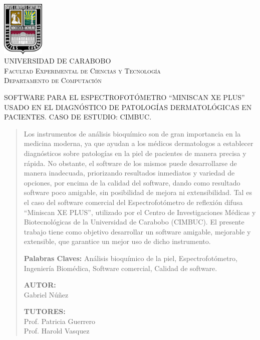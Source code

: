 \documentclass[12pt, a4paper]{article}
\begin{document}
\begin{center}

\includegraphics[width=0.15\textwidth]{./img/logo-uc.png}~\\[1cm]

\textsc{ UNIVERSIDAD DE CARABOBO \\
Facultad Experimental de Ciencias y Tecnolog\'{i}a\\
Departamento de Computaci\'{o}n
}

SOFTWARE PARA EL ESPECTROFOT\'{O}METRO ``MINISCAN XE PLUS'' USADO EN EL DIAGN\'{O}STICO DE PATOLOG\'{I}AS DERMATOL\'{O}GICAS EN PACIENTES. CASO DE ESTUDIO: CIMBUC.

\end{center}
\begin{abstract}
\noindent
Los instrumentos de an\'{a}lisis bioqu\'{i}mico son de gran importancia en la medicina moderna, ya que ayudan a los m\'{e}dicos dermatologos a establecer diagn\'{o}sticos sobre patolog\'{i}as en la piel de pacientes de manera precisa y r\'{a}pida. No obstante, el software de los mismos puede desarrollarse de manera inadecuada, priorizando resultados inmediatos y variedad de opciones, por encima de la calidad del software, dando como resultado software poco amigable, sin posibilidad de mejora ni extensibilidad. Tal es el caso del software comercial del Espectrofot\'{o}metro de reflexi\'{o}n difusa ``Miniscan XE PLUS'', utilizado por el Centro de Investigaciones M\'{e}dicas y Biotecnol\'{o}gicas de la Universidad de Carabobo (CIMBUC). El presente trabajo tiene como objetivo desarrollar un software amigable, mejorable y extensible, que garantice un mejor uso de dicho instrumento.

\vfill

\noindent
\textbf{Palabras Claves:} An\'{a}lisis bioqu\'{i}mico de la piel, Espectrofot\'{o}metro, Ingenier\'{i}a Biom\'{e}dica, Software comercial, Calidad de software.

\vfill
\begin{minipage}[t]{0.4\textwidth}
\begin{flushleft}
\textbf{AUTOR:}\\
Gabriel N\'{u}\~{n}ez
\end{flushleft}
\end{minipage}%
\begin{minipage}[t]{0.4\textwidth}
\begin{flushright}
\textbf{TUTORES:} \\
Prof. Patricia Guerrero \\
Prof. Harold Vasquez
\end{flushright}
\end{minipage}

\end{abstract}
\pagebreak
\end{document}
